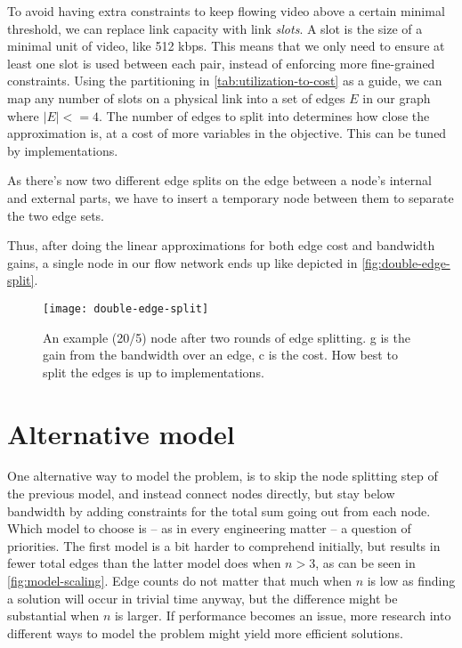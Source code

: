 To avoid having extra constraints to keep flowing video above a certain minimal threshold, we can replace link capacity with link \emph{slots}. A slot is the size of a minimal unit of video, like 512 kbps. This means that we only need to ensure at least one slot is used between each pair, instead of enforcing more fine-grained constraints. Using the partitioning in \autoref{tab:utilization-to-cost} as a guide, we can map any number of slots on a physical link into a set of edges $E$ in our graph where $|E| <= 4$. The number of edges to split into determines how close the approximation is, at a cost of more variables in the objective. This can be tuned by implementations.

As there's now two different edge splits on the edge between a node's internal and external parts, we have to insert a temporary node between them to separate the two edge sets.

Thus, after doing the linear approximations for both edge cost and bandwidth gains, a single node in our flow network ends up like depicted in \autoref{fig:double-edge-split}.

\begin{figure}
    \centering
    \texttt{[image: double-edge-split]}
    \caption{An example (20/5) node after two rounds of edge splitting. g is the gain from the bandwidth over an edge, c is the cost. How best to split the edges is up to implementations.}
    \label{fig:double-edge-split}
\end{figure}


\section{Alternative model}\label{sec:alternative-model}

One alternative way to model the problem, is to skip the node splitting step of the previous model, and instead connect nodes directly, but stay below bandwidth by adding constraints for the total sum going out from each node. Which model to choose is -- as in every engineering matter -- a question of priorities. The first model is a bit harder to comprehend initially, but results in fewer total edges than the latter model does when $n>3$, as can be seen in \autoref{fig:model-scaling}. Edge counts do not matter that much when $n$ is low as finding a solution will occur in trivial time anyway, but the difference might be substantial when $n$ is larger. If performance becomes an issue, more research into different ways to model the problem might yield more efficient solutions.

